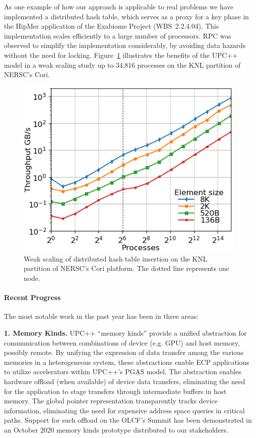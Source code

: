 As one example of how our approach is applicable to real problems
we have implemented a distributed hash table, which serves as a proxy
for a key phase in the HipMer application of the Exabiome Project (WBS~2.2.4.04).
This implementation scales efficiently
to a large number of processors. RPC was observed to simplify the implementation
considerably, by avoiding data hazards without the need for locking.
Figure~\ref{fig:dht} illustrates the benefits of the UPC++ model 
in a weak scaling study up to 34,816 processes on the KNL partition of NERSC's Cori.


\begin{figure}
  \vspace{-1.5em}
  \centering
      \includegraphics[scale=0.70]{projects/2.3.1-PMR/2.3.1.14-UPCxx-GASNet/all-cori-knl-out-inserts-wait.png}
  \caption{Weak scaling of distributed hash table insertion on the KNL partition of NERSC's Cori platform. The dotted line represents one node.}
  \label{fig:dht}
\end{figure}


\vspace{-2em}
\paragraph{Recent Progress}

The most notable work in the past year has been in three areas:

\textbf{1. Memory Kinds.}
UPC++ ``memory kinds'' provide a unified abstraction for communication between
combinations of device (e.g. GPU) and host memory, possibly remote.  By
unifying the expression of data transfer among the various memories in a
heterogeneous system, these abstractions enable ECP
applications to utilize accelerators within UPC++'s PGAS model.  The
abstraction enables hardware offload (when available) of device data transfers,
eliminating the need for the application to stage transfers through
intermediate buffers in host memory.
The global pointer representation transparently tracks device information,
eliminating the need for expensive address space queries in critical paths.
Support for such offload on the OLCF's
Summit has been demonstrated in an October 2020 memory kinds prototype
distributed to our stakeholders.


